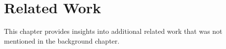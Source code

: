 \chapter{Related Work\label{cha:chapter5}}

This chapter provides insights into additional related work that was not mentioned in the background chapter. 
